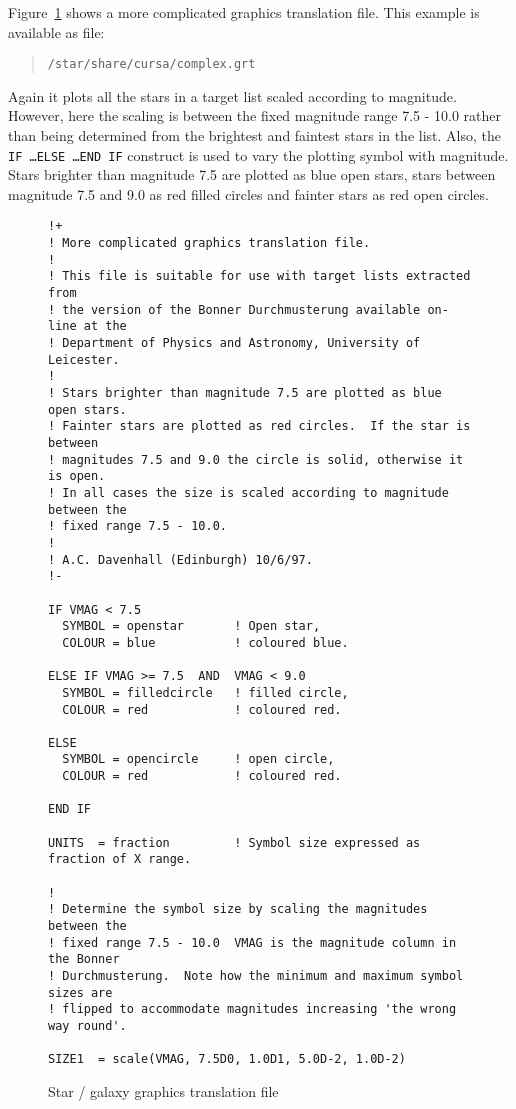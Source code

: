 \documentclass[twoside,11pt]{article}
\renewcommand{\_}{\texttt{\symbol{95}}}
\begin{document}
Figure~\ref{GRAPHTRAN2} shows a more complicated graphics translation
file.  This example is available as file:

\begin{verse}
{\tt /star/share/cursa/complex.grt}
\end{verse}

Again it plots all the stars in a target list scaled according to
magnitude.  However, here the scaling is between the fixed magnitude
range 7.5 - 10.0 rather than being determined from the brightest and
faintest stars in the list.  Also, the {\tt IF \ldots ELSE \ldots END
IF} construct is used to vary the plotting symbol with magnitude.  Stars
brighter than magnitude 7.5 are plotted as blue open stars, stars
between magnitude 7.5 and 9.0 as red filled circles and fainter stars as
red open circles.

\begin{figure}[htbp]
\begin{verbatim}
!+
! More complicated graphics translation file.
!
! This file is suitable for use with target lists extracted from
! the version of the Bonner Durchmusterung available on-line at the
! Department of Physics and Astronomy, University of Leicester.
!
! Stars brighter than magnitude 7.5 are plotted as blue open stars.
! Fainter stars are plotted as red circles.  If the star is between
! magnitudes 7.5 and 9.0 the circle is solid, otherwise it is open.
! In all cases the size is scaled according to magnitude between the
! fixed range 7.5 - 10.0.
!
! A.C. Davenhall (Edinburgh) 10/6/97.
!-

IF VMAG < 7.5
  SYMBOL = openstar       ! Open star,
  COLOUR = blue           ! coloured blue.

ELSE IF VMAG >= 7.5  AND  VMAG < 9.0
  SYMBOL = filledcircle   ! filled circle,
  COLOUR = red            ! coloured red.

ELSE 
  SYMBOL = opencircle     ! open circle,
  COLOUR = red            ! coloured red.

END IF

UNITS  = fraction         ! Symbol size expressed as fraction of X range.

!
! Determine the symbol size by scaling the magnitudes between the
! fixed range 7.5 - 10.0  VMAG is the magnitude column in the Bonner
! Durchmusterung.  Note how the minimum and maximum symbol sizes are
! flipped to accommodate magnitudes increasing 'the wrong way round'.

SIZE1  = scale(VMAG, 7.5D0, 1.0D1, 5.0D-2, 1.0D-2)
\end{verbatim}

\caption{Star / galaxy graphics translation file \label{GRAPHTRAN2} }

\end{figure}
\end{document}
